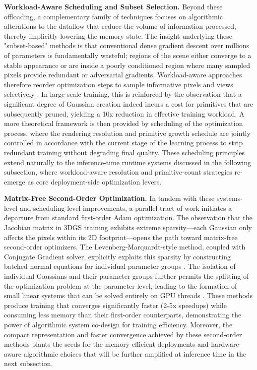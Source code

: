 \documentclass[11pt,a4paper]{article}
\begin{document}
\textbf{Workload-Aware Scheduling and Subset Selection.} Beyond these offloading, a complementary family of techniques focuses on algorithmic alterations to the dataflow that reduce the volume of information processed, thereby implicitly lowering the memory state. The insight underlying these "subset-based" methods is that conventional dense gradient descent over millions of parameters is fundamentally wasteful; regions of the scene either converge to a stable appearance or are inside a poorly conditioned region where many sampled pixels provide redundant or adversarial gradients. Workload-aware approaches therefore reorder optimization steps to sample informative pixels and views selectively \cite{arxiv:2503.18402v2}. In large-scale training, this is reinforced by the observation that a significant degree of Gaussian creation indeed incurs a cost for primitives that are subsequently pruned, yielding a 10x reduction in effective training workload. A more theoretical framework is then provided by scheduling of the optimization process, where the rendering resolution and primitive growth schedule are jointly controlled in accordance with the current stage of the learning process to strip redundant training without degrading final quality. These scheduling principles extend naturally to the inference-time runtime systems discussed in the following subsection, where workload-aware resolution and primitive-count strategies re-emerge as core deployment-side optimization levers.

\textbf{Matrix-Free Second-Order Optimization.} In tandem with these systems-level and scheduling-level improvements, a parallel tract of work initiates a departure from standard first-order Adam optimization. The observation that the Jacobian matrix in 3DGS training exhibits extreme sparsity---each Gaussian only affects the pixels within its 2D footprint---opens the path toward matrix-free second-order optimizers. The Levenberg-Marquardt-style method, coupled with Conjugate Gradient solver, explicitly exploits this sparsity by constructing batched normal equations for individual parameter groups \cite{arxiv:2504.12905v3}. The isolation of individual Gaussians and their parameter groups further permits the splitting of the optimization problem at the parameter level, leading to the formation of small linear systems that can be solved entirely on GPU threads \cite{arxiv:2501.13975v2}. These methods produce training that converges significantly faster (2-5x speedups) while consuming less memory than their first-order counterparts, demonstrating the power of algorithmic system co-design for training efficiency. Moreover, the compact representation and faster convergence achieved by these second-order methods plants the seeds for the memory-efficient deployments and hardware-aware algorithmic choices that will be further amplified at inference time in the next subsection.
\end{document}
